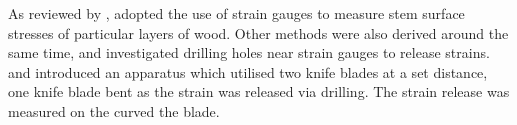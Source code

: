 As reviewed by \citet{kubler_1987}, \citet{Okuyama_1981} adopted the use of strain gauges to measure stem surface
stresses of particular layers of wood. Other methods were also derived around
the same time, \citet{gueneau1973,gueneau1973b} and \citet{kikata1977} investigated drilling holes near strain gauges to release strains.
\citet{Gueneau1974} and \citet{Saurat_1976} introduced an apparatus which utilised two knife
blades at a set distance, one knife blade bent as the strain was released via
drilling. The strain release was measured on the curved the blade. 

